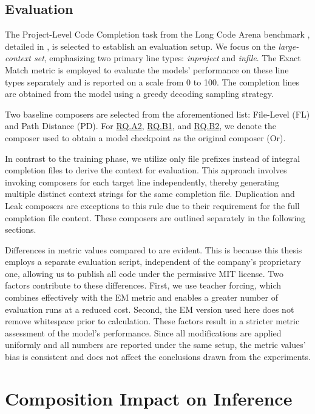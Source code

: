 \subsection{Evaluation}\label{sec:evaluation}

The Project-Level Code Completion task from the Long Code Arena benchmark \parencite{bogomolov2024}, detailed in , is selected to establish an evaluation setup. We focus on the \textit{large-context set}, emphasizing two primary line types: \textit{inproject} and \textit{infile}. The Exact Match metric is employed to evaluate the models' performance on these line types separately and is reported on a scale from 0 to 100. The completion lines are obtained from the model using a greedy decoding sampling strategy.

Two baseline composers are selected from the aforementioned list: File-Level (FL) and Path Distance (PD). For \hyperref[rq:rq-a2]{RQ.A2}, \hyperref[rq:rq-b1]{RQ.B1}, and \hyperref[rq:rq-b2]{RQ.B2}, we denote the composer used to obtain a model checkpoint as the original composer (Or).

In contrast to the training phase, we utilize only file prefixes instead of integral completion files to derive the context for evaluation. This approach involves invoking composers for each target line independently, thereby generating multiple distinct context strings for the same completion file. Duplication and Leak composers are exceptions to this rule due to their requirement for the full completion file content. These composers are outlined separately in the following sections.

Differences in metric values compared to \citet{sapronov2025} are evident. This is because this thesis employs a separate evaluation script, independent of the company's proprietary one, allowing us to publish all code under the permissive MIT license. Two factors contribute to these differences. First, we use teacher forcing, which combines effectively with the EM metric and enables a greater number of evaluation runs at a reduced cost. Second, the EM version used here does not remove whitespace prior to calculation. These factors result in a stricter metric assessment of the model's performance. Since all modifications are applied uniformly and all numbers are reported under the same setup, the metric values' bias is consistent and does not affect the conclusions drawn from the experiments.

\section{Composition Impact on Inference}\label{sec:composition-impact-on-inference}

